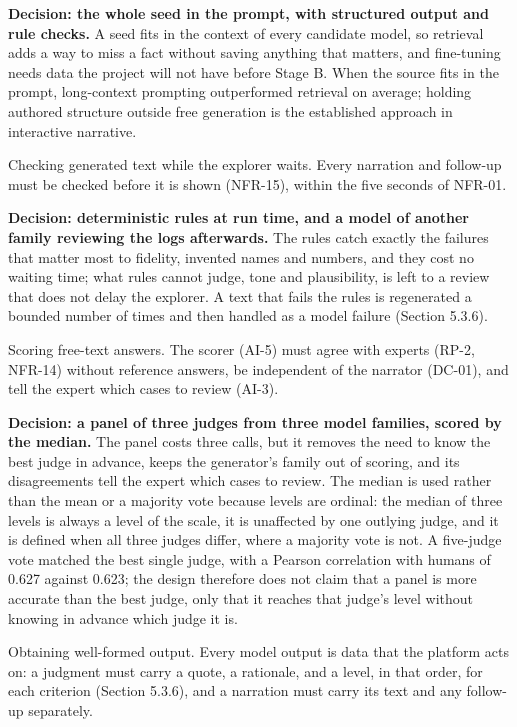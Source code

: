 \textbf{Decision: the whole seed in the prompt, with structured output and rule checks.} A seed fits in the context of every candidate model, so retrieval adds a way to miss a fact without saving anything that matters, and fine-tuning needs data the project will not have before Stage B. When the source fits in the prompt, long-\allowbreak{}context prompting outperformed retrieval on average\cite{r121}; holding authored structure outside free generation is the established approach in interactive narrative\cite{r120}.

Checking generated text while the explorer waits. Every narration and follow-up must be checked before it is shown (NFR-15), within the five seconds of NFR-01.

\textbf{Decision: deterministic rules at run time, and a model of another family reviewing the logs afterwards.\allowbreak{}} The rules catch exactly the failures that matter most to fidelity, invented names and numbers, and they cost no waiting time; what rules cannot judge, tone and plausibility, is left to a review that does not delay the explorer. A text that fails the rules is regenerated a bounded number of times and then handled as a model failure (Section 5.3.6).

Scoring free-text answers. The scorer (AI-5) must agree with experts (RP-2, NFR-14) without reference answers, be independent of the narrator (DC-01), and tell the expert which cases to review (AI-3).

\textbf{Decision: a panel of three judges from three model families, scored by the median.} The panel costs three calls, but it removes the need to know the best judge in advance, keeps the generator's family out of scoring, and its disagreements tell the expert which cases to review. The median is used rather than the mean or a majority vote because levels are ordinal: the median of three levels is always a level of the scale, it is unaffected by one outlying judge, and it is defined when all three judges differ, where a majority vote is not. A five-judge vote matched the best single judge, with a Pearson correlation with humans of 0.627 against 0.623\cite{r123}; the design therefore does not claim that a panel is more accurate than the best judge, only that it reaches that judge's level without knowing in advance which judge it is.

Obtaining well-formed output. Every model output is data that the platform acts on: a judgment must carry a quote, a rationale, and a level, in that order, for each criterion (Section 5.3.6), and a narration must carry its text and any follow-up separately.

